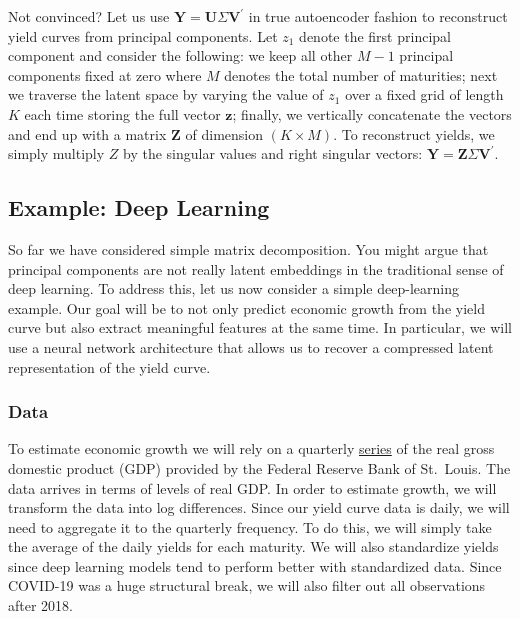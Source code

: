 \documentclass{article}
\theoremstyle{plain}
\theoremstyle{definition}
\theoremstyle{remark}
\begin{document}
Not convinced? Let us use
\(\mathbf{Y}=\mathbf{U}\Sigma\mathbf{V}^{\prime}\) in true autoencoder
fashion to reconstruct yield curves from principal components. Let
\(z_1\) denote the first principal component and consider the following:
we keep all other \(M-1\) principal components fixed at zero where \(M\)
denotes the total number of maturities; next we traverse the latent
space by varying the value of \(z_1\) over a fixed grid of length \(K\)
each time storing the full vector \(\mathbf{z}\); finally, we vertically
concatenate the vectors and end up with a matrix \(\mathbf{Z}\) of
dimension \((K \times M)\). To reconstruct yields, we simply multiply
\(Z\) by the singular values and right singular vectors:
\(\mathbf{Y}=\mathbf{Z}\Sigma\mathbf{V}^{\prime}\).

\subsection{Example: Deep Learning}\label{example-deep-learning}

So far we have considered simple matrix decomposition. You might argue
that principal components are not really latent embeddings in the
traditional sense of deep learning. To address this, let us now consider
a simple deep-learning example. Our goal will be to not only predict
economic growth from the yield curve but also extract meaningful
features at the same time. In particular, we will use a neural network
architecture that allows us to recover a compressed latent
representation of the yield curve.

\subsubsection{Data}\label{data}

To estimate economic growth we will rely on a quarterly
\href{https://fred.stlouisfed.org/series/GDPC1}{series} of the real
gross domestic product (GDP) provided by the Federal Reserve Bank of
St.~Louis. The data arrives in terms of levels of real GDP. In order to
estimate growth, we will transform the data into log differences. Since
our yield curve data is daily, we will need to aggregate it to the
quarterly frequency. To do this, we will simply take the average of the
daily yields for each maturity. We will also standardize yields since
deep learning models tend to perform better with standardized data.
Since COVID-19 was a huge structural break, we will also filter out all
observations after 2018.
\end{document}
